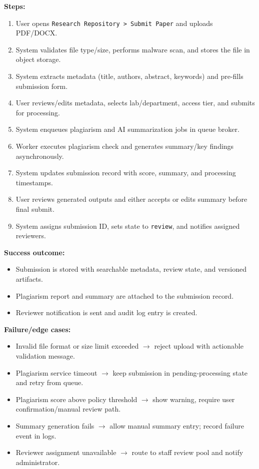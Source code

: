 \documentclass[12pt,a4paper]{article}
\begin{document}
\textbf{Steps:}
\begin{enumerate}
    \item User opens \texttt{Research Repository > Submit Paper} and uploads PDF/DOCX.
    \item System validates file type/size, performs malware scan, and stores the file in object storage.
    \item System extracts metadata (title, authors, abstract, keywords) and pre-fills submission form.
    \item User reviews/edits metadata, selects lab/department, access tier, and submits for processing.
    \item System enqueues plagiarism and AI summarization jobs in queue broker.
    \item Worker executes plagiarism check and generates summary/key findings asynchronously.
    \item System updates submission record with score, summary, and processing timestamps.
    \item User reviews generated outputs and either accepts or edits summary before final submit.
    \item System assigns submission ID, sets state to \texttt{review}, and notifies assigned reviewers.
\end{enumerate}

\textbf{Success outcome:}
\begin{itemize}
    \item Submission is stored with searchable metadata, review state, and versioned artifacts.
    \item Plagiarism report and summary are attached to the submission record.
    \item Reviewer notification is sent and audit log entry is created.
\end{itemize}

\textbf{Failure/edge cases:}
\begin{itemize}
    \item Invalid file format or size limit exceeded $\rightarrow$ reject upload with actionable validation message.
    \item Plagiarism service timeout $\rightarrow$ keep submission in pending-processing state and retry from queue.
    \item Plagiarism score above policy threshold $\rightarrow$ show warning, require user confirmation/manual review path.
    \item Summary generation fails $\rightarrow$ allow manual summary entry; record failure event in logs.
    \item Reviewer assignment unavailable $\rightarrow$ route to staff review pool and notify administrator.
\end{itemize}
\end{document}
